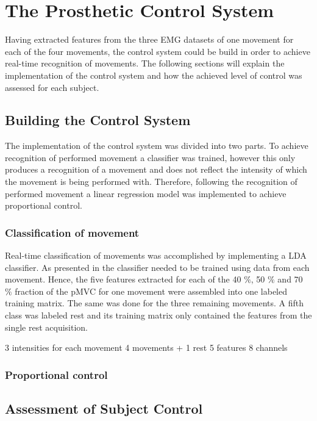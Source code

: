 
\section{The Prosthetic Control System}

Having extracted features from the three EMG datasets of one movement for each of the four movements, the control system could be build in order to achieve real-time recognition of movements. The following sections will explain the implementation of the control system and how the achieved level of control was assessed for each subject. 

\subsection{Building the Control System} 

The implementation of the control system was divided into two parts. To achieve recognition of performed movement a classifier was trained, however this only produces a recognition of a movement and does not reflect the intensity of which the movement is being performed with. Therefore, following the recognition of performed movement a linear regression model was implemented to achieve proportional control. 

\subsubsection{Classification of movement}

Real-time classification of movements was accomplished by implementing a LDA classifier. As presented in  the classifier needed to be trained using data from each movement. Hence, the five features extracted for each of the 40 $\percent$, 50 $\percent$ and 70 $\percent$ fraction of the pMVC for one movement were assembled into one labeled training matrix. The same was done for the three remaining movements. A fifth class was labeled rest and its training matrix only contained the features from the single rest acquisition.  

3 intensities for each movement 
4 movements + 1 rest 
5 features 
8 channels 

\subsubsection{Proportional control}  



\subsection{Assessment of Subject Control}

